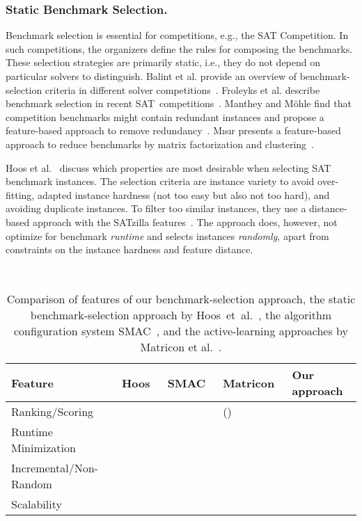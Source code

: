 \documentclass[runningheads]{llncs}
\newcommand{\cmark}{\ding{51}} %
\newcommand{\xmark}{\ding{55}}
\begin{document}
\subsubsection{Static Benchmark Selection.}

Benchmark selection is essential for competitions, e.g., the SAT Competition.
In such competitions, the organizers define the rules for composing the benchmarks.
These selection strategies are primarily static, i.e., they do not depend on particular solvers to distinguish.
Balint et al. provide an overview of benchmark-selection criteria in different solver competitions~\cite{balint2015overview}.
Froleyks et al. describe benchmark selection in recent SAT~competitions~\cite{FroleyksHIJS21}.
Manthey and Möhle find that competition benchmarks might contain redundant instances and propose a feature-based approach to remove redundancy~\cite{manthey2016better}.
M{\i}s{\i}r presents a feature-based approach to reduce benchmarks by matrix factorization and clustering~\cite{misir2021benchmark}.

Hoos et al.~\cite{HoosKSS13} discuss which properties are most desirable when selecting SAT benchmark instances.
The selection criteria are instance variety to avoid over-fitting, adapted instance hardness (not too easy but also not too hard), and avoiding duplicate instances.
To filter too similar instances, they use a distance-based approach with the SATzilla features~\cite{XuHHL08,features}.
The approach does, however, not optimize for benchmark \emph{runtime} and selects instances \emph{randomly}, apart from constraints on the instance hardness and feature distance.

\begin{table}[tbp]
  \centering
  \caption{Comparison of features of our benchmark-selection approach, the static benchmark-selection approach by Hoos~et~al.~\cite{HoosKSS13}, the algorithm configuration system SMAC~\cite{HutterHL11}, and the active-learning approaches by Matricon et al.~\cite{MatriconAFSH21}.
  }
  \label{tab:requirements}
  ~\\[1em]
  \begin{tabular}{
    m{}
    >{\centering\arraybackslash}m{}
    >{\centering\arraybackslash}m{}
    >{\centering\arraybackslash}m{}
    >{\centering\arraybackslash}m{}
  }
    \hline
    Feature & Hoos~\cite{HoosKSS13} & SMAC~\cite{HutterHL11} & Matricon~\cite{MatriconAFSH21} & Our approach \\
    \hline
    Ranking/Scoring & \cmark & \xmark & (\cmark) & \cmark \\
    Runtime Minimization & \xmark & \cmark & \cmark & \cmark \\
    Incremental/Non-Random & \xmark & \xmark & \cmark & \cmark \\
    Scalability & \cmark & \cmark & \xmark & \cmark \\
    \hline
  \end{tabular}
\end{table}
\end{document}
